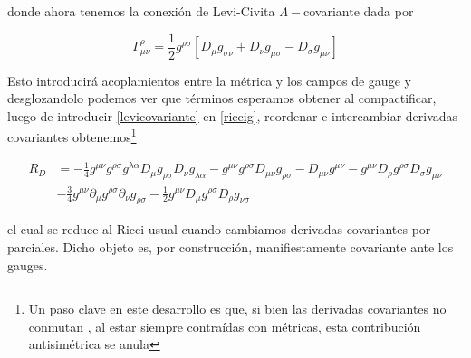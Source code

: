\documentclass{article}
\numberwithin{equation}{section}
\begin{document}
donde ahora tenemos la conexión de Levi-Civita $ \Lambda-$covariante dada por 

\begin{equation}\label{levicovariante}
\Gamma^{\rho}_{\mu \nu} = \frac{1}{2} g^{\rho \sigma}\left[ D_{\mu} g_{\sigma \nu} + D_{\nu} g_{\mu \sigma} - D_{\sigma} g_{\mu \nu}\right]
\end{equation}

Esto introducirá acoplamientos entre la métrica y los campos de gauge y desglozandolo podemos ver que términos esperamos obtener al compactificar, luego de introducir \ref{levicovariante} en \ref{riccig}, reordenar e intercambiar derivadas covariantes obtenemos\footnote{ Un paso clave en este desarrollo es que, si bien las derivadas covariantes no conmutan , al estar siempre contraídas con métricas, esta contribución antisimétrica se anula}


\begin{equation}\label{Rcov}
\begin{aligned}
R_D&= - \frac{1}{4}g^{\mu \nu} g^{\rho \sigma} g^{\lambda \alpha} D_{\mu}{g_{\rho \sigma}} D_{\nu}{g_{\lambda \alpha}} -g^{\mu \nu} g^{\rho \sigma} D_{\mu \nu}{g_{\rho \sigma}} - D_{\mu \nu} g^{\mu \nu} - g^{\mu \nu} D_{\rho}{g^{\rho \sigma}} D_{\sigma}{g_{\mu \nu}}\\
&-\frac{3}{4}g^{\mu \nu} \partial_{\mu}{g^{\rho \sigma}} \partial_{\nu}{g_{\rho \sigma}} - \frac{1}{2} g^{\mu \nu}D_{\mu}{g^{\rho \sigma}} D_{\rho}{g_{\nu \sigma}} 
\end{aligned}
\end{equation}

el cual se reduce al Ricci usual cuando cambiamos derivadas covariantes por parciales. Dicho objeto es, por construcción, manifiestamente covariante ante los gauges.\\
 
\end{document}
